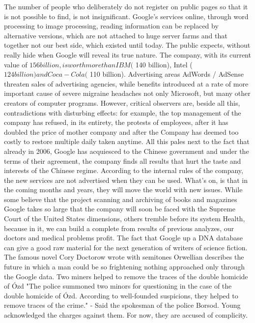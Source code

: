 The number of people who deliberately do not register on public pages so that it is not possible to find, is not insignificant. Google's services online, through word processing to image processing, reading information can be replaced by alternative versions, which are not attached to huge server farms and that together not our best side, which existed until today.
The public expects, without really hide when Google will reveal its true nature.
The company, with its current value of $ 156 billion, is worth more than IBM ($ 140 billion), Intel ($ 124 billion) and Coca-Cola ($ 110 billion). Advertising areas AdWords / AdSense threaten sales of advertising agencies, while benefits introduced at a rate of more important cause of severe migraine headaches not only Microsoft, but many other creators of computer programs.
However, critical observers are, beside all this, contradictions with disturbing effects: for example, the top management of the company has refused, in its entirety, the protests of employees, after it has doubled the price of mother company and after the Company has deemed too costly to restore multiple daily taken anytime. All this pales next to the fact that already in 2006, Google has acquiesced to the Chinese government and under the terms of their agreement, the company finds all results that hurt the taste and interests of the Chinese regime.
According to the internal rules of the company, the new services are not advertised when they can be used. What's on, is that in the coming months and years, they will move the world with new issues. While some believe that the project scanning and archiving of books and magazines Google takes so large that the company will soon be faced with the Supreme Court of the United States dimensions, others tremble before its system Health, because in it, we can build a complete from results of previous analyzes, our doctors and medical problems profit.
The fact that Google up a DNA database can give a good raw material for the next generation of writers of science fiction. The famous novel Cory Doctorow wrote with semitones Orwellian describes the future in which a man could be so frightening nothing approached only through the Google data.
Two miners helped to remove the traces of the double homicide of Ózd
"The police summoned two minors for questioning in the case of the double homicide of Ózd. According to well-founded suspicions, they helped to remove traces of the crime." - Said the spokesman of the police Borsod.
Young acknowledged the charges against them. For now, they are accused of complicity.
